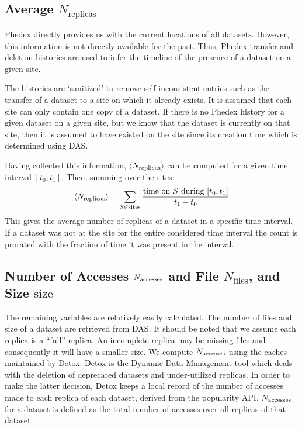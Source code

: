 \subsection{Average $N_\text{replicas}$}

Phedex directly provides us with the current locations of all datasets. However,
this information is not directly available for the past. Thus, Phedex transfer
and deletion histories are used to infer the timeline of the presence of a
dataset on a given site.

The histories are `sanitized' to remove self-inconsistent entries such as the
transfer of a dataset to a site on which it already exists. It is assumed that
each site can only contain one copy of a dataset. If there is no Phedex history
for a given dataset on a given site, but we know that the dataset is currently
on that site, then it is assumed to have existed on the site since its creation
time which is determined using DAS.

Having collected this information, $\langle N_\text{replicas}\rangle$ can be computed for a given time
interval $[t_0,t_1]$. Then, summing over the sites:
%
\begin{equation}
  \langle N_\text{replicas}\rangle = \sum_{S\in \text{sites}} \dfrac{\text{time on }S
        \text{ during }[t_0,t_1]}{t_1-t_0}
\end{equation}
%
This gives the average number of replicas of a dataset in a specific time
interval. If a dataset was not at the site for the entire considered time
interval the count is prorated with the fraction of time it was present in the
interval.

\subsection{Number of Accesses $N_\text{accesses}$ and File $N_\text{files}$,
            and Size $\text{size}$}

The remaining variables are relatively easily calculated. The number of files
and size of a dataset are retrieved from DAS. It should be noted that we assume
each replica is a ``full'' replica. An incomplete replica may be missing files
and consequently it will have a smaller size. We compute $N_\text{accesses}$ using the caches
maintained by Detox. Detox is the Dynamic Data Management tool which deals with
the deletion of deprecated datasets and under-utilized replicas. In order to
make the latter decision, Detox keeps a local record of the number of accesses
made to each replica of each dataset, derived from the popularity API. $N_\text{accesses}$ for
a dataset is defined as the total number of accesses over all replicas of that
dataset.

